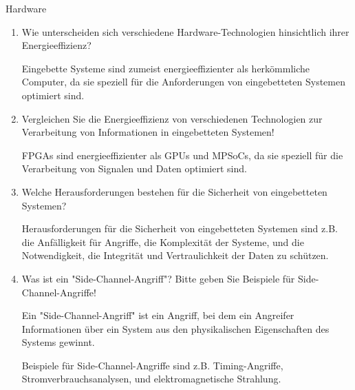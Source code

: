 \documentclass{article}
\begin{document}
\begin{exercise}{Hardware}
\begin{enumerate}
    \item Wie unterscheiden sich verschiedene Hardware-Technologien hinsichtlich ihrer Energieeffizienz?

          \begin{solution}
            Eingebette Systeme sind zumeist energieeffizienter als herkömmliche Computer, da sie speziell für die Anforderungen von eingebetteten Systemen optimiert sind.
          \end{solution}

    \item Vergleichen Sie die Energieeffizienz von verschiedenen Technologien zur Verarbeitung von Informationen in eingebetteten Systemen!

          \begin{solution}
            FPGAs sind energieeffizienter als GPUs und MPSoCs, da sie speziell für die Verarbeitung von Signalen und Daten optimiert sind.
          \end{solution}

    \item Welche Herausforderungen bestehen für die Sicherheit von eingebetteten Systemen?

          \begin{solution}
            Herausforderungen für die Sicherheit von eingebetteten Systemen sind z.B. die Anfälligkeit für Angriffe, die Komplexität der Systeme, und die Notwendigkeit, die Integrität und Vertraulichkeit der Daten zu schützen.
          \end{solution}

    \item Was ist ein "Side-Channel-Angriff"? Bitte geben Sie Beispiele für Side-Channel-Angriffe!

          \begin{solution}
            Ein "Side-Channel-Angriff" ist ein Angriff, bei dem ein Angreifer Informationen über ein System aus den physikalischen Eigenschaften des Systems gewinnt.

            Beispiele für Side-Channel-Angriffe sind z.B. Timing-Angriffe, Stromverbrauchsanalysen, und elektromagnetische Strahlung.
          \end{solution}
  \end{enumerate}
\end{exercise}
\end{document}
